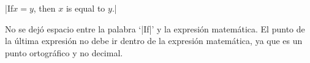 


\bigskip


|If$ x = y$, then $x$ is equal to $y.$|

\bigskip

\respuestaS No se dej\'o espacio entre la palabra `|If|' y la
expresi\'on matem\'atica. El punto de la \'ultima expresi\'on no debe
ir dentro de la expresi\'on matem\'atica, ya que es un punto
ortogr\'afico y no decimal.

\bye


